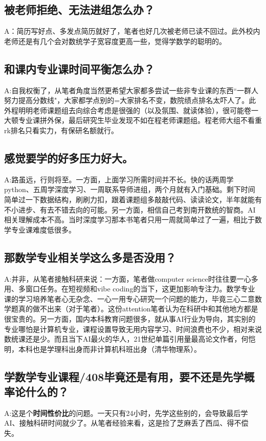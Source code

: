 \documentclass[12pt, a4paper, fontset=ubuntu]{ctexart}
\begin{document}
{\subsection{被老师拒绝、无法进组怎么办？}
A：简历写好点、多发点简历就好了，笔者也好几次被老师已读不回过。此外校内老师还是有几个会对数统学子宽容度更高一些，觉得学数学的聪明的。
\subsection{和课内专业课时间平衡怎么办？}
A:自我权衡了，从笔者角度当然更希望大家都多尝试一些非专业课的东西“一群人努力提高分数线"，大家都学点别的=大家排名不变，数院绩点排名太吓人了。此外程明明老师课题组去向综合考虑是很强的（以及氛围、就读体验），很可能卷一大顿专业课拼外保，最后研究生毕业发现不如在程老师课题组。程老师大组不看重rk排名只看实力，有保研名额就行。
\subsection{感觉要学的好多压力好大。}
A:路虽远，行则将至。一方面，上面学习所需时间并不长。快的话两周学python、五周学深度学习、一周联系导师进组，两个月就有入门基础。剩下时间简单过一下数据结构，刷刷力扣，跟着课题组多敲敲代码、读读论文，半年就能有不小进步、有去不错去向的可能。另一方面，相信自己考到南开数统的智商。AI相关理解成本不高。当时深度学习那本书笔者只用一周就简单过了一遍，相比于数学专业课难度低很多。
\subsection{那数学专业相关学这么多是否没用？}
A:并非，从笔者接触科研来说：一方面，笔者做computer science时往往要一心多用、多窗口任务。在短视频和vibe coding的当下，这更加影响专注力。数学专业课的学习培养笔者心无杂念、一心一用专心研究一个问题的能力，毕竟三心二意数学题真的做不出来（对于笔者）。这份attention笔者认为在科研中和其他地方都是很宝贵的。另一方面，国内本科教育问题很多，就从事AI行业为导向，其实别的专业哪怕是计算机专业，课程设置导致无用内容学习、时间浪费也不少，相对来说数统课还是少。而且当下AI最火的华人，21世纪单篇引用量最高论文作者，何恺明，本科也是学理科出身而非计算机科班出身（清华物理系）。
\subsection{学数学专业课程/408毕竟还是有用，要不还是先学概率论什么的？}
A:这是个\textbf{时间性价比}的问题。一天只有24小时，先学这些别的，会导致最后学AI、接触科研时间就少了。从笔者经验来看，这是捡了芝麻丢了西瓜、得不偿失。
}
\end{document}
